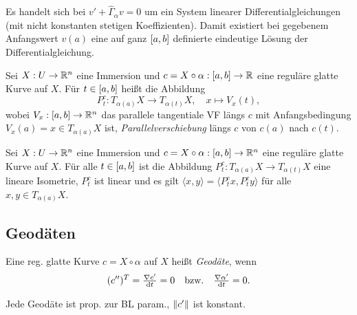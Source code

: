 \documentclass{cheat-sheet}
\begin{document}
\begin{bem}
  Es handelt sich bei $v' + \hat{\Gamma}_\alpha v = 0$ um ein System linearer Differentialgleichungen (mit nicht konstanten stetigen Koeffizienten). Damit existiert bei gegebenem Anfangswert $v(a)$ eine auf ganz $\left[ a, b \right]$ definierte eindeutige Lösung der Differentialgleichung.
\end{bem}

\begin{defn}
  Sei $X : U \to \mathbb{R}^n$ eine Immersion und $c = X \circ \alpha : \left[ a, b \right] \to \mathbb{R}$ eine reguläre glatte Kurve auf $X$. Für $t \in \left[ a, b \right]$ heißt die Abbildung
  \[ P_t^c : T_{\alpha(a)} X \to T_{\alpha(t)} X, \quad x \mapsto V_x(t), \]
  wobei $V_x : \left[ a, b \right] \to \mathbb{R}^n$ das parallele tangentiale VF längs $c$ mit Anfangsbedingung $V_x(a) = x \in T_{\alpha(a)} X$ ist, \emph{Parallelverschiebung} längs $c$ von $c(a)$ nach $c(t)$.
\end{defn}

\begin{samepage}

\begin{satz}
  Sei $X : U \to \mathbb{R}^n$ eine Immersion und $c = X \circ \alpha : \left[ a, b \right] \to \mathbb{R}^n$ eine reguläre glatte Kurve auf $X$. Für alle $t \in \left[ a, b \right]$ ist die Abbildung $P_t^c : T_{\alpha(a)} X \to T_{\alpha(t)} X$ eine lineare Isometrie, \dh{} $P_t^c$ ist linear und es gilt $\langle x, y \rangle = \langle P_t^c x, P_t^c y \rangle$ für alle $x, y \in T_{\alpha(a)} X$.
\end{satz}


\subsection{Geodäten}

\end{samepage}

\begin{defn}
  Eine reg. glatte Kurve $c = X \!\circ\! \alpha$ auf $X$ heißt \emph{Geodäte}, wenn
  \[ (c'')^T = \tfrac{\nabla c'}{\mathrm{d} t} = 0 \quad\text{bzw.}\quad \tfrac{\nabla \alpha'}{\mathrm{d} t} = 0. \]
\end{defn}

\begin{satz}
  Jede Geodäte ist prop. zur BL param., \dh{} $\lVert c'\rVert$ ist konstant.
\end{satz}
\end{document}
